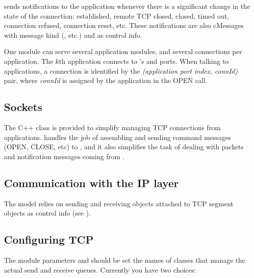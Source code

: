  sends notifications to the application whenever there is a significant
change in the state of the connection: established, remote TCP closed,
closed, timed out, connection refused, connection reset, etc. These
notifications are also cMessages with message kind 
(, etc.) and  as control info.

One  module can serve several application modules, and several
connections per application. The $k$th application connects to 's
 and  ports. When talking to applications, a
connection is identified by the \textit{(application port index, connId)} pair,
where \textit{connId} is assigned by the application in the OPEN call.

\subsection{Sockets}

The  C++ class is provided to simplify managing TCP connections
from applications.  handles the job of assembling and sending
command messages (OPEN, CLOSE, etc) to , and it also simplifies
the task of dealing with packets and notification messages coming from .

\subsection{Communication with the IP layer}

The  model relies on sending and receiving  objects
attached to TCP segment objects as control info (see ).

\subsection{Configuring TCP}

The module parameters  and  should be
set the names of classes that manage the actual send and receive queues.
Currently you have two choices:

